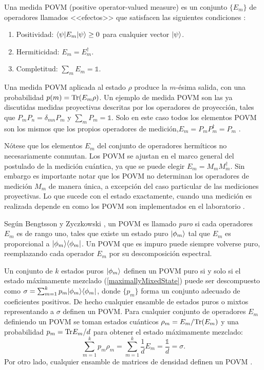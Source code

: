 \begin{definition} Una medida POVM (positive operator-valued measure) es un conjunto $\{E_{m}\}$ de operadores llamados <<efectos>> que satisfacen las siguientes condiciones {\cite{2007geometry}}:
	\begin{enumerate}
		\item Positividad: $\langle \psi |E_m|\psi \rangle \ge 0 $ para cualquier vector $|\psi\rangle$.
		\item Hermiticidad: $E_m=E_{m}^\dagger$.
		\item  Completitud: $\sum_m E_m =\mathds{1}$.
	\end{enumerate}
\end{definition}

Una medida POVM aplicada al estado $\rho$ produce la $m$-ésima salida, con una
probabilidad $p(m)={\rm Tr}(E_m \rho)$. Un ejemplo de medida POVM son las ya
discutidas medidas proyectivas descritas por los operadores de proyección,
tales que $P_m P_n=\delta_{mn}P_{m}$ y $\sum_m P_m = \mathds{1}$. Solo en este
caso todos los elementos POVM son los mismos que los propios operadores de
medición,$E_m=P_m P_m^\dagger=P_m$ {\cite{nielsen_chuang_2010}}.


Nótese que los elementos $E_m$ del conjunto de operadores hermíticos no
necesariamente conmutan. Los POVM se ajustan en el marco general del postulado
de la medición cuántica, ya que se puede elegir $E_m=M_m M_m^{\dagger}$. Sin
embargo es importante notar que los POVM no determinan los operadores de
medición $M_m$ de manera única, a excepción del caso particular de las
mediciones proyectivas. Lo que sucede con el estado exactamente, cuando una
medición es realizada depende en como los POVM son implementados en el
laboratorio {\cite{2007geometry}}.   

Según Bengtsson y Zyczkowski {\cite{2007geometry}}, un POVM es llamado
\textit{puro} si cada operadores $E_m$ es de rango uno, tales que existe un
estado puro $|\phi_m\rangle$ tal que $E_m$ es proporcional a $|\phi_m\rangle \langle\phi_m|$.
Un POVM que es impuro puede siempre volverse puro, reemplazando
cada operador $E_m$ por su descomposición espectral. 

Un conjunto de $k$ estados puros $|\phi_m \rangle$ definen un POVM puro si y solo
si el estado máximamente mezclado (\ref{maximallyMixedState}) puede ser
descompuesto como  $\sigma=\sum_{m=1}^{k}p_m|\phi_m\rangle \langle\phi_m|$, donde
$\{p_m\}$ forma un conjunto adecuado de coeficientes positivos. De hecho
cualquier ensamble de estados puros o mixtos representando a $\sigma$ definen
un POVM\@. Para cualquier conjunto de operadores $E_m$ definiendo un POVM se
toman estados cuánticos $\rho_m=E_m/{\rm Tr}(E_m)$ y una probabilidad $p_m={\rm Tr}
E_m/d$ para obtener el estado máximamente mezclado: 
\begin{equation}
	\sum_{m=1}^{k} p_m\rho _{m}=\sum_{m=1}^k \dfrac{1}{d}E_m=\dfrac{\mathds{1}}{d}=\sigma.
\end{equation}
Por otro lado, cualquier ensamble de matrices de densidad definen un POVM
{\cite{2007geometry}}. 


